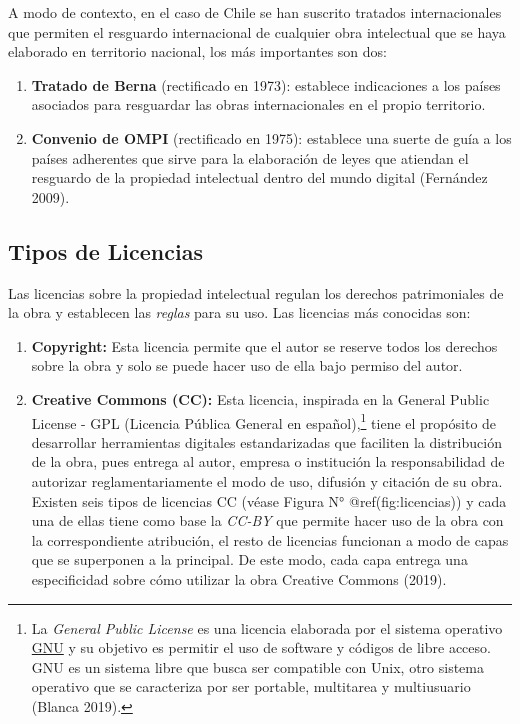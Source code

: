 \documentclass[
  spanish,
  letterpaper,
  DIV=11,
  numbers=noendperiod]{scrreprt}
\begin{document}
A modo de contexto, en el caso de Chile se han suscrito tratados
internacionales que permiten el resguardo internacional de cualquier
obra intelectual que se haya elaborado en territorio nacional, los más
importantes son dos:

\begin{enumerate}
\def\labelenumi{\arabic{enumi}.}
\item
  \textbf{Tratado de Berna} (rectificado en 1973): establece
  indicaciones a los países asociados para resguardar las obras
  internacionales en el propio territorio.
\item
  \textbf{Convenio de OMPI} (rectificado en 1975): establece una suerte
  de guía a los países adherentes que sirve para la elaboración de leyes
  que atiendan el resguardo de la propiedad intelectual dentro del mundo
  digital (Fernández 2009).
\end{enumerate}

\subsection{Tipos de Licencias}\label{tipos-de-licencias}

Las licencias sobre la propiedad intelectual regulan los derechos
patrimoniales de la obra y establecen las \emph{reglas} para su uso. Las
licencias más conocidas son:

\begin{enumerate}
\def\labelenumi{\arabic{enumi}.}
\item
  \textbf{Copyright:} Esta licencia permite que el autor se reserve
  todos los derechos sobre la obra y solo se puede hacer uso de ella
  bajo permiso del autor.
\item
  \textbf{Creative Commons (CC):} Esta licencia, inspirada en la General
  Public License - GPL (Licencia Pública General en español),\footnote{La
    \emph{General Public License} es una licencia elaborada por el
    sistema operativo \href{https://www.gnu.org/licenses/}{GNU} y su
    objetivo es permitir el uso de software y códigos de libre acceso.
    GNU es un sistema libre que busca ser compatible con Unix, otro
    sistema operativo que se caracteriza por ser portable, multitarea y
    multiusuario (Blanca 2019).} tiene el propósito de desarrollar
  herramientas digitales estandarizadas que faciliten la distribución de
  la obra, pues entrega al autor, empresa o institución la
  responsabilidad de autorizar reglamentariamente el modo de uso,
  difusión y citación de su obra. Existen seis tipos de licencias CC
  (véase Figura N° @ref(fig:licencias)) y cada una de ellas tiene como
  base la \emph{CC-BY} que permite hacer uso de la obra con la
  correspondiente atribución, el resto de licencias funcionan a modo de
  capas que se superponen a la principal. De este modo, cada capa
  entrega una especificidad sobre cómo utilizar la obra Creative Commons
  (2019).
\end{enumerate}
\end{document}
